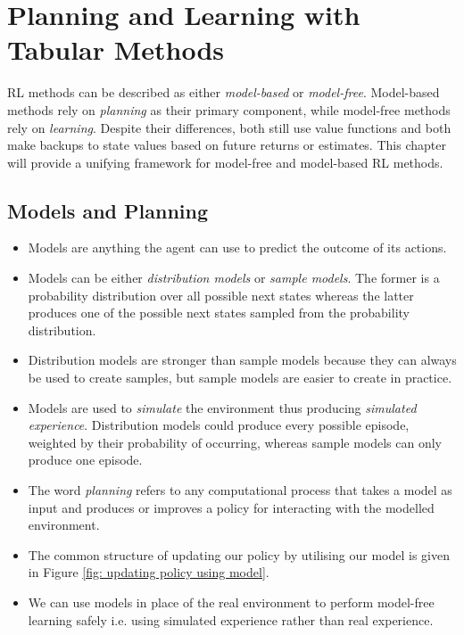 \section{Planning and Learning with Tabular Methods}
RL methods can be described as either \textit{model-based} or \textit{model-free}. Model-based methods rely on \textit{planning} as their primary component, while model-free methods rely on \textit{learning}. Despite their differences, both still use value functions and both make backups to state values based on future returns or estimates. This chapter will provide a unifying framework for model-free and model-based RL methods.

\subsection{Models and Planning}
\begin{itemize}
	\item Models are anything the agent can use to predict the outcome of its actions.
	\item Models can be either \textit{distribution models} or \textit{sample models}. The former is a probability distribution over all possible next states whereas the latter produces one of the possible next states sampled from the probability distribution.
	\item Distribution models are stronger than sample models because they can always be used to create samples, but sample models are easier to create in practice.
	\item Models are used to \textit{simulate} the environment thus producing \textit{simulated experience}. Distribution models could produce every possible episode, weighted by their probability of occurring, whereas sample models can only produce one episode.
	\item The word \textit{planning} refers to any computational process that takes a model as input and produces or improves a policy for interacting with the modelled environment.
	\item The common structure of updating our policy by utilising our model is given in Figure \ref{fig: updating policy using model}.
	\item We can use models in place of the real environment to perform model-free learning safely i.e. using simulated experience rather than real experience.
\end{itemize}

